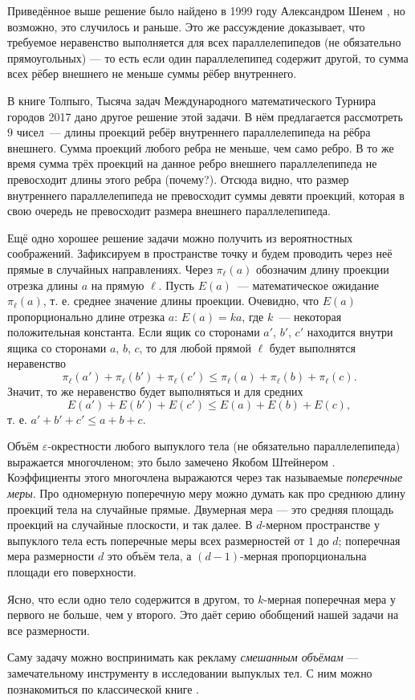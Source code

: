 \begin{addedbytheeditors}
Приведённое выше решение было найдено в 1999 году Александром Шенем \cite{shen}, но возможно, это случилось и раньше.
Это же рассуждение доказывает, что требуемое неравенство выполняется для всех параллелепипедов (не обязательно прямоугольных) --- то есть если один параллелепипед содержит другой, то сумма всех рёбер внешнего не меньше суммы рёбер внутреннего.

В книге Толпыго, Тысяча задач Международного математического Турнира городов 
2017 дано другое решение этой задачи. В нём предлагается рассмотреть $9$ чисел~--- длины проекций ребёр внутреннего параллелепипеда на рёбра внешнего. Сумма проекций любого ребра не меньше, чем само ребро. В то же время сумма трёх проекций на данное ребро внешнего параллелепипеда не превосходит длины этого ребра (почему?). Отсюда видно, что размер внутреннего параллелепипеда не превосходит суммы девяти проекций, которая в свою очередь не превосходит размера внешнего параллелепипеда.

Ещё одно хорошее решение задачи можно получить из вероятностных соображений. Зафиксируем в пространстве точку и будем проводить через неё прямые в случайных направлениях. Через $\pi_\ell(a)$ обозначим длину проекции отрезка длины $a$ на прямую $\ell$. Пусть $E(a)$~--- математическое ожидание $\pi_\ell(a)$, т. е. среднее значение длины проекции. Очевидно, что $E(a)$ пропорционально длине отрезка $a$: $E(a)=ka$, где $k$~--- некоторая положительная константа. Если ящик со сторонами $a'$,  $b'$, $c'$ находится внутри ящика со сторонами $a$, $b$, $c$, то для любой прямой $\ell$ будет выполнятся неравенство
$$\pi_\ell(a')+\pi_\ell(b')+\pi_\ell(c')\le \pi_\ell(a)+\pi_\ell(b)+\pi_\ell(c).$$ Значит, то же неравенство будет выполняться и для средних
$$E(a')+E(b')+E(c')\le E(a)+E(b)+E(c),$$
т. е. $a'+b'+c'\le a+b+c.$



Объём $\varepsilon$-окрестности любого выпуклого тела (не обязательно параллелепипеда) выражается многочленом; это было замечено Якобом Штейнером \cite{steiner}.
Коэффициенты этого многочлена выражаются через так называемые \emph{поперечные меры}.
Про одномерную поперечную меру можно думать как про среднюю длину проекций тела на случайные прямые.
Двумерная мера --- это средняя площадь проекций на случайные плоскости, и так далее.
В $d$-мерном пространстве у выпуклого тела есть поперечные меры всех размерностей от $1$ до $d$;
поперечная мера размерности $d$ это объём тела, а $(d-1)$-мерная пропорциональна площади его поверхности.

Ясно, что если одно тело содержится в другом, то $k$-мерная поперечная мера у первого не больше, чем у второго.
Это даёт серию обобщений нашей задачи на все размерности.

Саму задачу можно воспринимать как рекламу \emph{смешанным объёмам} --- замечательному инструменту в исследовании выпуклых тел.
С ним можно познакомиться по классической книге \cite{burago-zalgaller}.\pr
\end{addedbytheeditors}



